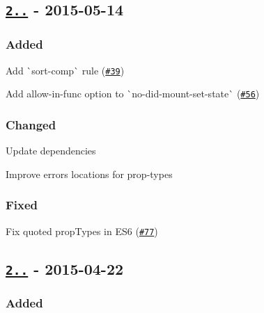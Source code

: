 \subsection*{\href{https://github.com/yannickcr/eslint-plugin-react/compare/v2.2.0...v2.3.0}{\tt 2..} -\/ 2015-\/05-\/14}

\subsubsection*{Added}


\begin{DoxyItemize}
\item Add \`{}sort-\/comp\`{} rule (\href{https://github.com/yannickcr/eslint-plugin-react/issues/39}{\tt \#39})
\item Add {\ttfamily allow-\/in-\/func} option to \`{}no-\/did-\/mount-\/set-\/state\`{} (\href{https://github.com/yannickcr/eslint-plugin-react/issues/56}{\tt \#56})
\end{DoxyItemize}

\subsubsection*{Changed}


\begin{DoxyItemize}
\item Update dependencies
\item Improve errors locations for {\ttfamily prop-\/types}
\end{DoxyItemize}

\subsubsection*{Fixed}


\begin{DoxyItemize}
\item Fix quoted prop\+Types in E\+S6 (\href{https://github.com/yannickcr/eslint-plugin-react/issues/77}{\tt \#77})
\end{DoxyItemize}

\subsection*{\href{https://github.com/yannickcr/eslint-plugin-react/compare/v2.1.1...v2.2.0}{\tt 2..} -\/ 2015-\/04-\/22}

\subsubsection*{Added}


